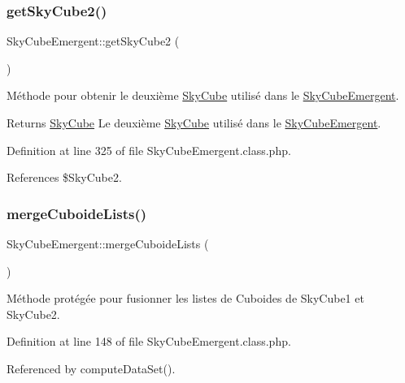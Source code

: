 \subsubsection{\texorpdfstring{get\+Sky\+Cube2()}{getSkyCube2()}}
{\footnotesize\ttfamily Sky\+Cube\+Emergent\+::get\+Sky\+Cube2 (\begin{DoxyParamCaption}{ }\end{DoxyParamCaption})}

Méthode pour obtenir le deuxième \hyperlink{class_sky_cube}{Sky\+Cube} utilisé dans le \hyperlink{class_sky_cube_emergent}{Sky\+Cube\+Emergent}.

\begin{DoxyReturn}{Returns}
\hyperlink{class_sky_cube}{Sky\+Cube} Le deuxième \hyperlink{class_sky_cube}{Sky\+Cube} utilisé dans le \hyperlink{class_sky_cube_emergent}{Sky\+Cube\+Emergent}. 
\end{DoxyReturn}


Definition at line 325 of file Sky\+Cube\+Emergent.\+class.\+php.



References \$\+Sky\+Cube2.

\mbox{\label{class_sky_cube_emergent_a23fbbd0a04a7bcf18dad60373d400aba}} 
\subsubsection{\texorpdfstring{merge\+Cuboide\+Lists()}{mergeCuboideLists()}}
{\footnotesize\ttfamily Sky\+Cube\+Emergent\+::merge\+Cuboide\+Lists (\begin{DoxyParamCaption}{ }\end{DoxyParamCaption})\hspace{0.3cm}{\ttfamily [protected]}}

Méthode protégée pour fusionner les listes de Cuboides de Sky\+Cube1 et Sky\+Cube2. 

Definition at line 148 of file Sky\+Cube\+Emergent.\+class.\+php.



Referenced by compute\+Data\+Set().

